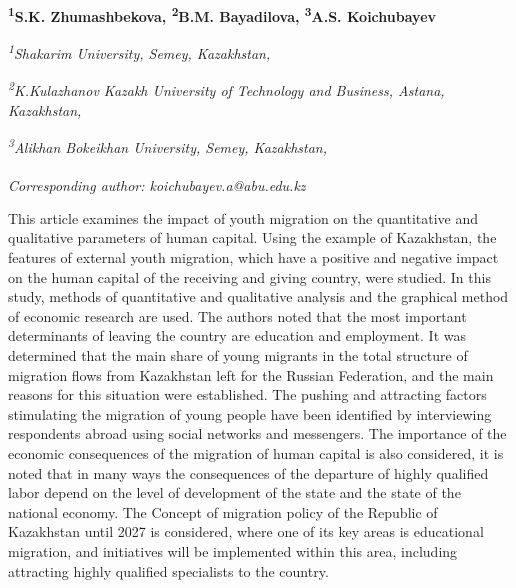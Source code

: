
\begin{articleheader}

{\bfseries
\textsuperscript{1}S.K. Zhumashbekova,
\textsuperscript{2}B.M. Bayadilova,
\textsuperscript{3}A.S. Koichubayev\textsuperscript{\envelope } }
\end{articleheader}

\begin{affiliation}
\emph{\textsuperscript{1}Shakarim University, Semey, Kazakhstan,}

\emph{\textsuperscript{2}K.Kulazhanov Kazakh University of Technology and Business, Astana, Kazakhstan,}

\emph{\textsuperscript{3}Alikhan Bokeikhan University, Semey, Kazakhstan,}

\raggedright \textsuperscript{\envelope }{\em Corresponding author: koichubayev.a@abu.edu.kz}
\end{affiliation}

This article examines the impact of youth migration on the quantitative
and qualitative parameters of human capital. Using the example of
Kazakhstan, the features of external youth migration, which have a
positive and negative impact on the human capital of the receiving and
giving country, were studied. In this study, methods of quantitative and
qualitative analysis and the graphical method of economic research are
used. The authors noted that the most important determinants of leaving
the country are education and employment. It was determined that the
main share of young migrants in the total structure of migration flows
from Kazakhstan left for the Russian Federation, and the main reasons
for this situation were established. The pushing and attracting factors
stimulating the migration of young people have been identified by
interviewing respondents abroad using social networks and messengers.
The importance of the economic consequences of the migration of human
capital is also considered, it is noted that in many ways the
consequences of the departure of highly qualified labor depend on the
level of development of the state and the state of the national economy.
The Concept of migration policy of the Republic of Kazakhstan until 2027
is considered, where one of its key areas is educational migration, and
initiatives will be implemented within this area, including attracting
highly qualified specialists to the country.


